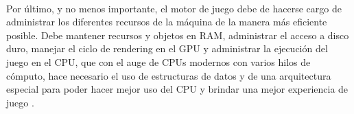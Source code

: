 \documentclass{standalone}
\begin{document}
\paragraph{}
Por último, y no menos importante, el motor de juego debe de hacerse cargo de administrar los diferentes recursos de la máquina de la manera más eficiente posible. Debe mantener recursos y objetos en RAM, administrar el acceso a disco duro, manejar el ciclo de rendering en el GPU y administrar la ejecución del juego en el CPU, que con el auge de CPUs modernos con varios hilos de cómputo, hace necesario el uso de estructuras de datos y de una arquitectura especial para poder hacer mejor uso del CPU y brindar una mejor experiencia de juego \cite{andrews2009designing}.
\end{document}
